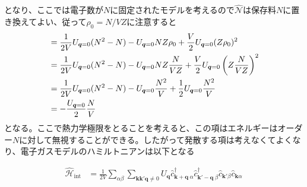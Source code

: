 \documentclass[dvipdfmx, 11pt, a4paper]{jsarticle}
\theoremstyle{definition}
\numberwithin{equation}{section}
\begin{document}
    となり、ここでは電子数が$N$に固定されたモデルを考えるので$\hat{\mathscr{N}}$は保存料$N$に置き換えてよい、従って$\rho_0 = N/VZ$に注意すると
    \begin{align}
        &=\frac{1}{2V} U_{\bm{q}=0} (N^2-N) - U_{\bm{q}=0}N Z\rho_0 + \frac{V}{2}U_{\bm{q}=0}(Z\rho_0)^2 \notag \\
        &=\frac{1}{2V} U_{\bm{q}=0} (N^2-N) - U_{\bm{q}=0}N Z\frac{N}{VZ} + \frac{V}{2}U_{\bm{q}=0}\left(Z\frac{N}{VZ}\right)^2 \notag \\
        &=\frac{1}{2V} U_{\bm{q}=0} (N^2-N) - U_{\bm{q}=0}\frac{N^2}{V} + \frac{1}{2}U_{\bm{q}=0}\frac{N^2}{V}\notag \\
        &= -\frac{U_{\bm{q}=0}}{2} \frac{N}{V}
    \end{align}
    となる。ここで熱力学極限をとることを考えると、この項はエネルギーはオーダー$N$に対して無視することができる。したがって発散する項は考えなくてよくなり、電子ガスモデルのハミルトニアンは以下となる
    \begin{definition}[電子ガスモデルのハミルトニアン]
        \begin{align}
            \hat{\mathscr{H}}_{\text{int}}&=\frac{1}{2V}\sum_{\alpha \beta}\sum_{\bm{k}\bm{k}'\bm{q}\ne0} U_{\bm{q}} \hat{c}^\dagger_{\bm{k}+\bm{q}\ \alpha} \hat{c}^\dagger_{\bm{k}'-\bm{q}\ \beta} \hat{c}_{\bm{k}'\beta} \hat{c}_{\bm{k}\alpha}
        \end{align}
    \end{definition}
\end{document}
